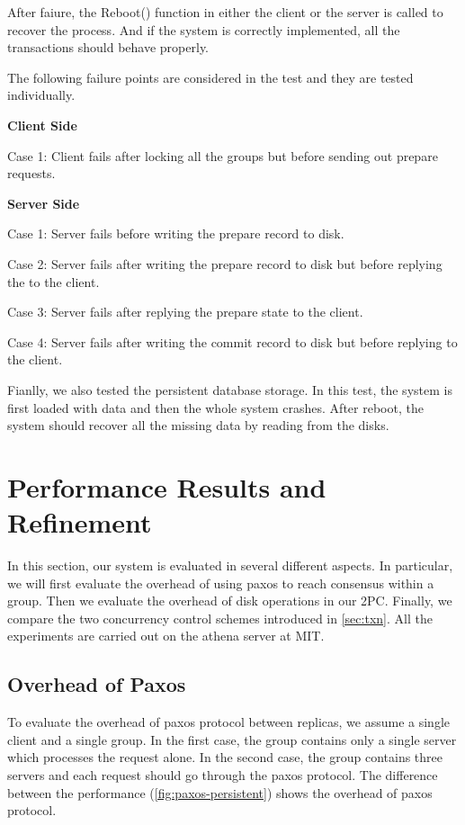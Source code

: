 \documentclass{vldb}
\begin{document}
After faiure, the Reboot() function in either the client or the server 
is called to recover the process. And if the system is correctly 
implemented, all the transactions should behave properly.

The following failure points are considered in the test and they are 
tested individually.

\textbf{Client Side}

Case 1: Client fails after locking all the groups but before sending 
out prepare requests.

\textbf{Server Side}

Case 1: Server fails before writing the prepare record to disk.

Case 2: Server fails after writing the prepare record to disk but 
before replying the to the client.

Case 3: Server fails after replying the prepare state to the client.

Case 4: Server fails after writing the commit record to disk but 
before replying to the client.

Fianlly, we also tested the persistent database storage. In this test, 
the system is first loaded with data and then the whole system 
crashes. After reboot, the system should recover all the missing data 
by reading from the disks. 

\section{Performance Results and Refinement}
\label{sec:eval}

In this section, our system is evaluated in several different aspects.  
In particular, we will first evaluate the overhead of using paxos to 
reach consensus within a group. Then we evaluate the overhead of disk 
operations in our 2PC. Finally, we compare the two concurrency control 
schemes introduced in \cref{sec:txn}. All the experiments are carried 
out on the athena server at MIT. 

\subsection{Overhead of Paxos}

To evaluate the overhead of paxos protocol between replicas, we assume 
a single client and a single group.  In the first case, the group 
contains only a single server which processes the request alone.  In 
the second case, the group contains three servers and each request 
should go through the paxos protocol.  The difference between the 
performance (\cref{fig:paxos-persistent}) shows the overhead of paxos 
protocol. 
\end{document}

